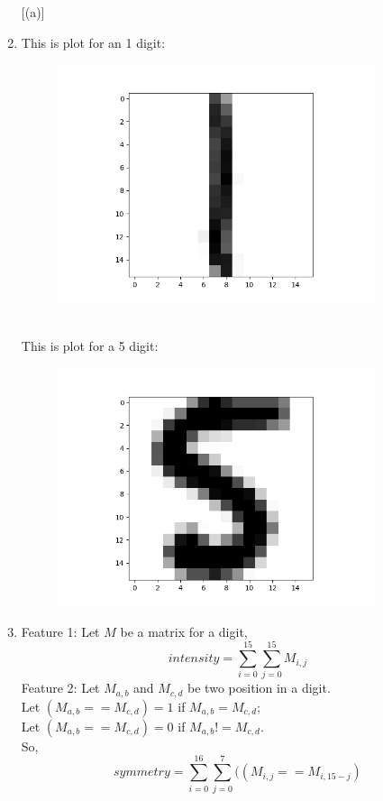 \documentclass[11pt]{article}
\begin{document}
\begin{enumerate} [(a)]
	\item This is plot for an 1 digit:\\
	\begin{figure}[htb]
		{\includegraphics[height=7cm]{digit1.png}}
	\end{figure}\\
	This is plot for a 5 digit:\\
	\begin{figure}[htb]
		{\includegraphics[height=7cm]{digit5.png}}
	\end{figure}

	\newpage

	\item Feature 1: Let $M$ be a matrix for a digit,\[
		intensity = \sum^{15}_{i=0}\sum^{15}_{j=0}M_{i,j}
	\]
	Feature 2: Let $M_{a,b}$ and $M_{c,d}$ be two position in a digit.\\
	Let $(M_{a,b} == M_{c,d}) = 1$ if $M_{a,b} = M_{c,d}$;\\
	Let $(M_{a,b} == M_{c,d}) = 0$ if $M_{a,b} != M_{c,d}$.\\
	So,\[
		symmetry = \sum^{16}_{i=0}\sum^7_{j=0}((M_{i,j} == M_{i,15-j})
	\]



\end{enumerate}
\end{document}
